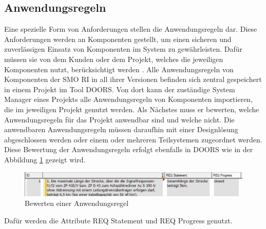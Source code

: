 \subsection{Anwendungsregeln}
Eine spezielle Form von Anforderungen stellen die Anwendungsregeln dar. Diese Anforderungen werden an Komponenten gestellt, um einen sicheren
und zuverlässigen Einsatz von Komponenten im System zu gewährleisten. Dafür müssen sie von dem Kunden oder dem Projekt, welches die jeweiligen 
Komponenten nutzt, berücksichtigt werden \cite[vgl. S.9]{SMO-AR}. Alle Anwendungsregeln von Komponenten der \ac{SMO RI} in all ihrer Versionen
befinden sich zentral gespeichert in einem Projekt im Tool \ac{DOORS}. Von dort kann der zuständige System Manager eines Projekts alle 
Anwendungsregeln von Komponenten importieren, die im jeweiligen Projekt genutzt werden. Als Nächstes muss er bewerten, welche 
Anwendungsregeln für das Projekt anwendbar sind und welche nicht. Die anwendbaren Anwendungsregeln müssen daraufhin mit einer Designlösung
abgeschlossen werden oder einem oder mehreren Teilsystemen zugeordnet werden. Diese Bewertung der Anwendungsregeln erfolgt ebenfalls in \ac{DOORS}
wie in der Abbildung \ref*{fig:BewerteteAR} gezeigt wird.
\begin{figure}[h]
    \centering
    \includegraphics[width = \textwidth]{abbildungen/Bewertete AR.png}
    \caption{Bewerten einer Anwendungsregel}
    \label{fig:BewerteteAR}
\end{figure}
Dafür werden die Attribute REQ Statement und REQ Progress genutzt. 